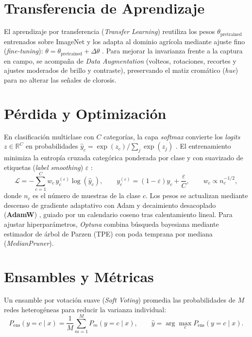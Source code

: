 \section{Transferencia de Aprendizaje}

El aprendizaje por transferencia (\textit{Transfer Learning}) reutiliza los pesos $\theta_{\text{pretrained}}$ entrenados sobre ImageNet y los adapta al dominio agr\'icola mediante ajuste fino (\textit{fine-tuning}): $\theta = \theta_{\text{pretrained}} + \Delta\theta$ \cite{deng2009,chollet2021}. Para mejorar la invarianza frente a la captura en campo, se acompa\~na de \textit{Data Augmentation} \cite{shorten2019} (volteos, rotaciones, recortes y ajustes moderados de brillo y contraste), preservando el matiz crom\'atico (\textit{hue}) para no alterar las se\~nales de clorosis.

\section{P\'erdida y Optimizaci\'on}

En clasificaci\'on multiclase con $C$ categor\'ias, la capa \textit{softmax} convierte los \textit{logits} $z\in\mathbb{R}^{C}$ en probabilidades $\hat{y}_c = \exp(z_c)/\sum_{j}\exp(z_j)$ \cite{hastie2009}. El entrenamiento minimiza la entrop\'ia cruzada categ\'orica \cite{chollet2021} ponderada por clase y con suavizado de etiquetas (\textit{label smoothing}) $\varepsilon$ \cite{szegedy2016}:
\begin{equation}
\mathcal{L} = -\sum_{c=1}^{C} w_c\, y_c^{(\varepsilon)} \log(\hat{y}_c), \qquad y_c^{(\varepsilon)} = (1-\varepsilon)y_c + \frac{\varepsilon}{C}, \qquad w_c \propto n_c^{-1/2},
\end{equation}
donde $n_c$ es el n\'umero de muestras de la clase $c$. Los pesos se actualizan mediante descenso de gradiente adaptativo con Adam \cite{kingma2015} y decaimiento desacoplado (\textbf{AdamW}) \cite{loshchilov2019}, guiado por un calendario coseno tras calentamiento lineal. Para ajustar hiperpar\'ametros, \textit{Optuna} \cite{optuna2019} combina b\'usqueda bayesiana mediante estimador de \'arbol de Parzen (TPE) con poda temprana por mediana (\textit{MedianPruner}).

\section{Ensambles y M\'etricas}

Un ensamble por votaci\'on suave (\textit{Soft Voting}) \cite{hastie2009} promedia las probabilidades de $M$ redes heterog\'eneas para reducir la varianza individual:
\begin{equation}
P_{\text{ens}}(y=c\mid x) = \frac{1}{M}\sum_{m=1}^{M} P_m(y=c\mid x), \qquad \hat{y} = \arg\max_{c} P_{\text{ens}}(y=c\mid x).
\label{eq:softvoting_mt}
\end{equation}

